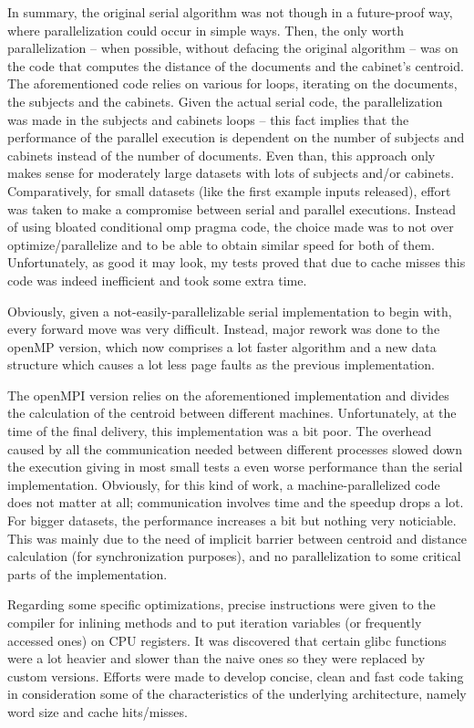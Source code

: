 \documentclass[times, 10pt,twocolumn]{article}
\begin{document}
	In summary, the original serial algorithm was not though in a future-proof way, where parallelization could occur in simple ways.
	Then, the only worth parallelization – when possible, without defacing the original algorithm –  was on the code that computes the distance of the documents and the cabinet's centroid. The aforementioned code relies on various for loops, iterating on the documents, the subjects and the cabinets. Given the actual serial code, the parallelization was made in the subjects and cabinets loops – this fact implies that the performance of the parallel execution is dependent on the number of subjects and cabinets instead of the number of documents. Even than, this approach only makes sense for moderately large datasets with lots of subjects and/or cabinets. Comparatively, for small datasets (like the first example inputs released), effort was taken to make a compromise between serial and parallel executions. Instead of using bloated conditional omp pragma code, the choice made was to not over optimize/parallelize and to be able to obtain similar speed for both of them. Unfortunately, as good it may look, my tests proved that due to cache misses this code was indeed inefficient and took some extra time.

	Obviously, given a not-easily-parallelizable serial implementation to begin with, every forward move was very difficult. Instead, major rework was done to the openMP version, which now comprises a lot faster algorithm and a new data structure which causes a lot less page faults as the previous implementation.

	The openMPI version relies on the aforementioned implementation and divides the calculation of the centroid between different machines. Unfortunately, at the time of the final delivery, this implementation was a bit poor. The overhead caused by all the communication needed between different processes slowed down the execution giving in most small tests a even worse performance than the serial implementation. Obviously, for this kind of work, a machine-parallelized code does not matter at all; communication involves time and the speedup drops a lot. For bigger datasets, the performance increases a bit but nothing very noticiable. This was mainly due to the need of implicit barrier between centroid and distance calculation (for synchronization purposes), and no parallelization to some critical parts of the implementation.	

	Regarding some specific optimizations, precise instructions were given to the compiler for inlining methods and to put iteration variables (or frequently accessed ones) on CPU registers. It was discovered that certain glibc functions were a lot heavier and slower than the naive ones so they were replaced by custom versions. Efforts were made to develop concise, clean and fast code taking in consideration some of the characteristics of the underlying architecture, namely word size and cache hits/misses.
 
\end{document}
